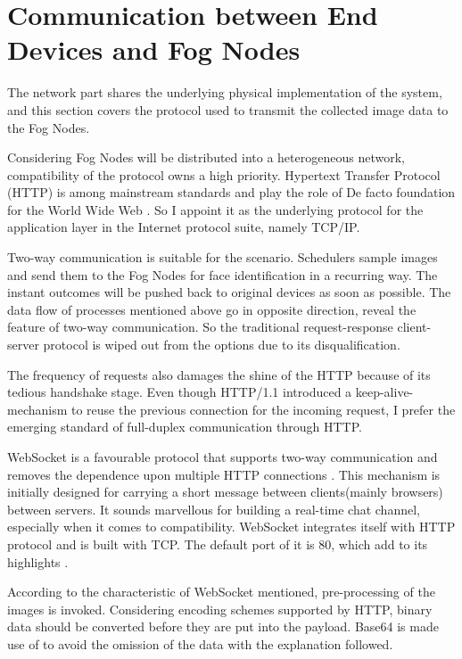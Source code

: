 \section{Communication between End Devices and Fog Nodes}
The network part shares the underlying physical implementation of the system, and this section covers the protocol used to transmit the collected image data to the Fog Nodes.

Considering Fog Nodes will be distributed into a heterogeneous network, compatibility of the protocol owns a high priority. Hypertext Transfer Protocol (HTTP) is among mainstream standards and play the role of De facto foundation for the World Wide Web \cite{fielding1999hypertext}. So I appoint it as the underlying protocol for the application layer in the Internet protocol suite, namely TCP/IP.

Two-way communication is suitable for the scenario. Schedulers sample images and send them to the Fog Nodes for face identification in a recurring way. The instant outcomes will be pushed back to original devices as soon as possible. The data flow of processes mentioned above go in opposite direction, reveal the feature of two-way communication. So the traditional request-response client-server protocol is wiped out from the options due to its disqualification.

The frequency of requests also damages the shine of the HTTP because of its tedious handshake stage. Even though HTTP/1.1 introduced a keep-alive-mechanism to reuse the previous connection for the incoming request, I prefer the emerging standard of full-duplex communication through HTTP.

WebSocket is a favourable protocol that supports two-way communication and removes the dependence upon multiple HTTP connections  \cite{fette2011websocket}. This mechanism is initially designed for carrying a short message between clients(mainly browsers) between servers. It sounds marvellous for building a real-time chat channel, especially when it comes to compatibility. WebSocket integrates itself with HTTP protocol and is built with TCP. The default port of it is 80, which add to its highlights \cite{fette2011websocket}.

According to the characteristic of WebSocket mentioned, pre-processing of the images is invoked. Considering encoding schemes supported by HTTP, binary data should be converted before they are put into the payload. Base64 is made use of to avoid the omission of the data with the explanation followed.

